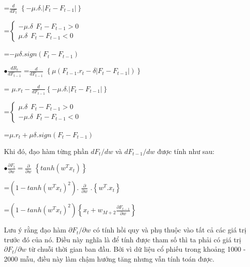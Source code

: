 \documentclass[14pt]{extreport}
\begin{document}
{\Large \hspace{1.2cm} =$\frac{d}{dF_t}$ } $\left \{ -\mu.\delta.\left | F_t-F_{t-1} \right | \right \}$


\hspace{1.2cm}=$\left\{\begin{matrix}
 -\mu.\delta \ \  F_t-F_{t-1}>0  & \\ 
 \mu.\delta \ \ F_t-F_{t-1}<0
\end{matrix}\right.$


\hspace{1.2cm}=$-\mu\delta.sign\left ( F_t-F_{t-1} \right )$

{\Large $\bullet \frac{dR_t}{dF_{t-1}}$} {\Large=$\frac{d}{dF_{t-1}}$ }$\left \{ \mu\left ( F_{t-1}.r_t-\delta\left | F_t-F_{t-1} \right | \right ) \right \}$


\hspace{1.2cm} = {\Large$\mu.r_t-\frac{d}{dF_{t-1}}$}$\left \{ -\mu.\delta.\left | F_t-F_{t-1} \right | \right \}$


\hspace{1.2cm}=$\left\{\begin{matrix}
 \mu.\delta \ \  F_t-F_{t-1}>0  & \\ 
 -\mu.\delta \ \ F_t-F_{t-1}<0
\end{matrix}\right.$


\hspace{1.2cm}=$\mu.r_t+\mu \delta.sign\left ( F_t-F_{t-1} \right )$


Khi đó, đạo hàm từng phần $dF_t/dw$ và $dF_{t-1}/dw$ được tính như sau:

{\Large $\bullet\frac{\partial F_t}{\partial w} = \frac{\partial}{\partial w}$ }$\left \{ tanh(w^Tx_t) \right \}$

\hspace{1.2cm}=$\left ( 1-tanh\left ( w^Tx_t \right )^2 \right ).$ {\Large$\frac{\partial}{\partial w}$ } $.\left \{ w^T.x_t \right \}$

\hspace{1.2cm}=$\left ( 1-tanh\left ( w^Tx_t \right )^2 \right )\left \{ x_t+w_{M+2}\frac{\partial F_{t-1}}{\partial w}\right \}$

Lưu ý rằng đạo hàm $\partial F_t/\partial w$ có tính hồi quy và phụ thuộc vào tất cả các giá trị trước đó của nó. Điều này nghĩa là để tính được tham số thì ta phải có giá trị $\partial F_t/\partial w$ từ chuỗi thời gian ban đầu. Bởi vì dữ liệu cổ phiếu trong khoảng 1000 - 2000 mẫu, điều này làm chậm hướng tăng nhưng vẫn tính toán được.
\end{document}
